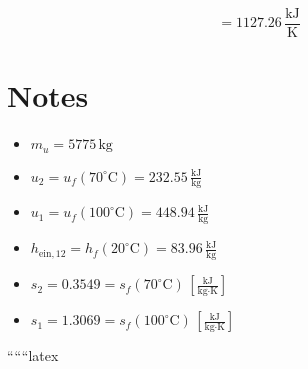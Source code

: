 \begin{equation*}
= \boxed{1127.26 \, \frac{\text{kJ}}{\text{K}}}
\end{equation*}

\section*{Notes}

\begin{itemize}
    \item $m_u = 5775 \, \text{kg}$
    \item $u_2 = u_f (70^\circ \text{C}) = 232.55 \, \frac{\text{kJ}}{\text{kg}}$
    \item $u_1 = u_f (100^\circ \text{C}) = 448.94 \, \frac{\text{kJ}}{\text{kg}}$
    \item $h_{\text{ein},12} = h_f (20^\circ \text{C}) = 83.96 \, \frac{\text{kJ}}{\text{kg}}$
    \item $s_2 = 0.3549 = s_f (70^\circ \text{C}) \, \left[ \frac{\text{kJ}}{\text{kg} \cdot \text{K}} \right]$
    \item $s_1 = 1.3069 = s_f (100^\circ \text{C}) \, \left[ \frac{\text{kJ}}{\text{kg} \cdot \text{K}} \right]$
\end{itemize}

``````latex


